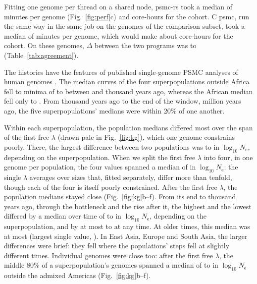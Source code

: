 \documentclass[11pt]{article}
\newcommand{\psmcrs}{psmc-rs}
\newcommand{\Ne}{\ensuremath{N_\mathrm{e}}}
\begin{document}
Fitting one genome per thread on a shared node, \psmcrs{} took a median of \EsevenRsFitMin{} minutes per genome (Fig.~\ref{fig:perf}c) and \EsevenRsCoreHours{} core-hours for the cohort. C psmc, run the same way in the same job on the \EsevenDefault{} genomes of the comparison subset, took a median of \EsevenCFitMin{} minutes per genome, which would make about \EsevenCCoreHoursAll{} core-hours for the cohort. On these \EsevenDefault{} genomes, $\Delta$ between the two programs was \EsevenRsCRmseMin{} to \EsevenRsCRmseMax{} (Table~\ref{tab:agreement}).

The histories have the features of published single-genome PSMC analyses of human genomes \citep[Fig.~\ref{fig:kg}a;][]{li2011,prufer2014,mallick2016}. The median curves of the four superpopulations outside Africa fell to minima of \EsevenNonAfrMinNeLo{} to \EsevenNonAfrMinNeHi{} between \EsevenNonAfrMinKyLo{} and \EsevenNonAfrMinKyHi{} thousand years ago, whereas the African median fell only to \EsevenAfrMinNe{}. From \EsevenConvergeKy{} thousand years ago to the end of the window, \EsevenWindowHiMy{} million years ago, the five superpopulations' medians were within 20\% of one another.

Within each superpopulation, the population medians differed most over the span of the first free $\lambda$ (drawn pale in Fig.~\ref{fig:kg}), which one genome constrains poorly. There, the largest difference between two populations was \EsevenPopSpreadRecentLo{} to \EsevenPopSpreadRecentHi{} in $\log_{10}\Ne$, depending on the superpopulation. When we split the first free $\lambda$ into four, in one genome per population, the four values spanned a median of \EsevenSplitSpanMedian{} in $\log_{10}\Ne$: the single $\lambda$ averages over sizes that, fitted separately, differ more than tenfold, though each of the four is itself poorly constrained. After the first free $\lambda$, the population medians stayed close (Fig.~\ref{fig:kg}b--f). From its end to \EsevenPopCutKy{} thousand years ago, through the bottleneck and the rise after it, the highest and the lowest differed by a median over time of \EsevenPopSpreadMidMedLo{} to \EsevenPopSpreadMidMedHi{} in $\log_{10}\Ne$, depending on the superpopulation, and by at most \EsevenPopSpreadMidLo{} to \EsevenPopSpreadMidHi{} at any time. At older times, this median was at most \EsevenPopSpreadOldMed{} (largest single value, \EsevenPopSpreadOldMax{}). In East Asia, Europe and South Asia, the larger differences were brief: they fell where the populations' steps fell at slightly different times. Individual genomes were close too: after the first free $\lambda$, the middle 80\% of a superpopulation's genomes spanned a median of \EsevenIndivSpreadLo{} to \EsevenIndivSpreadHi{} in $\log_{10}\Ne$ outside the admixed Americas (Fig.~\ref{fig:kg}b--f).
\end{document}

